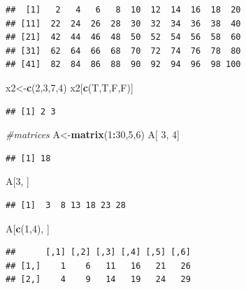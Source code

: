 \documentclass[
]{book}
\newenvironment{Shaded}{\begin{snugshade}}{\end{snugshade}}
\newcommand{\CommentTok}[1]{\textcolor[rgb]{0.56,0.35,0.01}{\textit{#1}}}
\newcommand{\DecValTok}[1]{\textcolor[rgb]{0.00,0.00,0.81}{#1}}
\newcommand{\KeywordTok}[1]{\textcolor[rgb]{0.13,0.29,0.53}{\textbf{#1}}}
\newcommand{\NormalTok}[1]{#1}
\newcommand{\OperatorTok}[1]{\textcolor[rgb]{0.81,0.36,0.00}{\textbf{#1}}}
\begin{document}
\begin{verbatim}
##  [1]   2   4   6   8  10  12  14  16  18  20
## [11]  22  24  26  28  30  32  34  36  38  40
## [21]  42  44  46  48  50  52  54  56  58  60
## [31]  62  64  66  68  70  72  74  76  78  80
## [41]  82  84  86  88  90  92  94  96  98 100
\end{verbatim}

\begin{Shaded}
\begin{Highlighting}[]
\NormalTok{x2<-}\KeywordTok{c}\NormalTok{(}\DecValTok{2}\NormalTok{,}\DecValTok{3}\NormalTok{,}\DecValTok{7}\NormalTok{,}\DecValTok{4}\NormalTok{)}
\NormalTok{x2[}\KeywordTok{c}\NormalTok{(T,T,F,F)]}
\end{Highlighting}
\end{Shaded}

\begin{verbatim}
## [1] 2 3
\end{verbatim}

\begin{Shaded}
\begin{Highlighting}[]
\CommentTok{#matrices}
\NormalTok{A<-}\KeywordTok{matrix}\NormalTok{(}\DecValTok{1}\OperatorTok{:}\DecValTok{30}\NormalTok{,}\DecValTok{5}\NormalTok{,}\DecValTok{6}\NormalTok{)}
\NormalTok{A[ }\DecValTok{3}\NormalTok{, }\DecValTok{4}\NormalTok{]}
\end{Highlighting}
\end{Shaded}

\begin{verbatim}
## [1] 18
\end{verbatim}

\begin{Shaded}
\begin{Highlighting}[]
\NormalTok{A[}\DecValTok{3}\NormalTok{, ]}
\end{Highlighting}
\end{Shaded}

\begin{verbatim}
## [1]  3  8 13 18 23 28
\end{verbatim}

\begin{Shaded}
\begin{Highlighting}[]
\NormalTok{A[}\KeywordTok{c}\NormalTok{(}\DecValTok{1}\NormalTok{,}\DecValTok{4}\NormalTok{), ]}
\end{Highlighting}
\end{Shaded}

\begin{verbatim}
##      [,1] [,2] [,3] [,4] [,5] [,6]
## [1,]    1    6   11   16   21   26
## [2,]    4    9   14   19   24   29
\end{verbatim}
\end{document}
